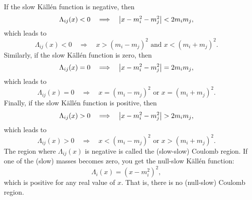 If the slow K\"{a}ll\'{e}n function is negative, then
\begin{equation}
	\Lambda_{ij}(x) < 0 \quad \Longrightarrow \quad \left\lvert x - m_{i}^{2} - m_{j}^{2} \right\rvert < 2 m_{i} m_{j},
\end{equation}
which leads to
\begin{equation}
	\Lambda_{ij}(x) < 0 \quad \Longrightarrow \quad x > \left(m_{i} - m_{j}\right)^{2} \text{ and } x < \left(m_{i} + m_{j}\right)^{2}.
\end{equation}
Similarly, if the slow K\"{a}ll\'{e}n function is zero, then
\begin{equation}
	\Lambda_{ij}(x) = 0 \quad \Longrightarrow \quad \left\lvert x - m_{i}^{2} - m_{j}^{2} \right\rvert = 2 m_{i} m_{j},
\end{equation}
which leads to
\begin{equation}
	\Lambda_{ij}(x) = 0 \quad \Longrightarrow \quad x = \left(m_{i} - m_{j}\right)^{2} \text{ or } x = \left(m_{i} + m_{j}\right)^{2}.
\end{equation}
Finally, if the slow K\"{a}ll\'{e}n function is positive, then
\begin{equation}
	\Lambda_{ij}(x) > 0 \quad \Longrightarrow \quad \left\lvert x - m_{i}^{2} - m_{j}^{2} \right\rvert > 2 m_{i} m_{j},
\end{equation}
which leads to
\begin{equation}
	\Lambda_{ij}(x) > 0 \quad \Longrightarrow \quad x < \left(m_{i} - m_{j}\right)^{2} \text{ or } x > \left(m_{i} + m_{j}\right)^{2}.
\end{equation}
The region where $\Lambda_{ij}(x)$ is negative is called the (slow-slow) Coulomb region. If one of the (slow) masses becomes zero, you get the null-slow K\"{a}ll\'{e}n function:
\begin{equation}
	\Lambda_{i}(x) = \left( x - m_{i}^{2} \right)^{2},
\end{equation}
which is positive for any real value of $x$. That is, there is no (null-slow) Coulomb region.
